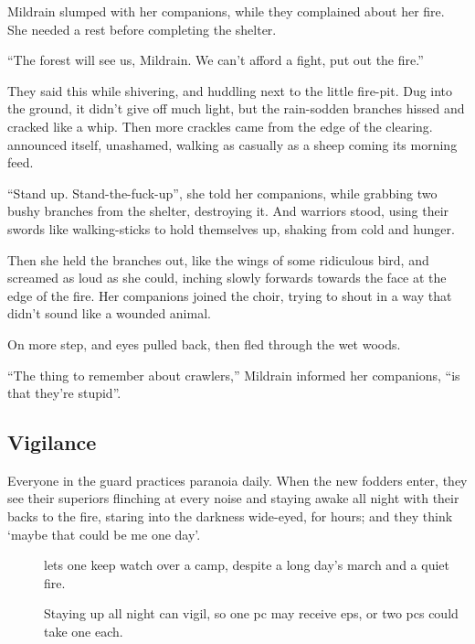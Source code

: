 \begin{multicols}{2}
\begin{exampletext}
  Mildrain slumped with her companions, while they complained about her fire.
  She needed a rest before completing the shelter.

  ``The forest will see us, Mildrain.
  We can't afford a fight, put out the fire.''

  They said this while shivering, and huddling next to the little fire-pit.
  Dug into the ground, it didn't give off much light, but the rain-sodden branches hissed and cracked like a whip.
  Then more crackles came from the edge of the clearing.
   announced itself, unashamed, walking as casually as a sheep coming its morning feed.

  ``Stand up.
  Stand-the-fuck-up'', she told her companions, while grabbing two bushy branches from the shelter, destroying it.
  And warriors stood, using their swords like walking-sticks to hold themselves up, shaking from cold and hunger.

  Then she held the branches out, like the wings of some ridiculous bird, and screamed as loud as she could, inching slowly forwards towards the face at the edge of the fire.
  Her companions joined the choir, trying to shout in a way that didn't sound like a wounded animal.

  On more step, and eyes pulled back, then fled through the wet woods.

  ``The thing to remember about \glspl{crawler},''
  Mildrain informed her companions,
  ``is that they're stupid''.

\end{exampletext}

\subsection{Vigilance}

Everyone in the \gls{guard} practices paranoia daily.
When the new \glspl{fodder} enter, they see their superiors flinching at every noise and staying awake all night with their backs to the fire, staring into the darkness wide-eyed, for hours; and they think `maybe that could be me one day'.

\begin{description}
  \item[]
    lets one keep watch over a camp, despite a long day's march and a quiet fire.

    Staying up all night can \glsdesc{vigil}, so one \gls{pc} may receive \glspl{ep}, or two \glspl{pc} could take one each.


\end{description}
\end{multicols}
